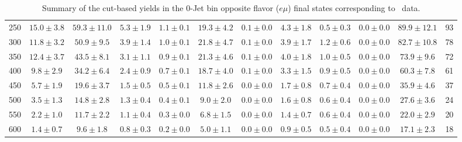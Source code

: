\begin{table}
{\begin{center}
\begin{tabular}{l c c c c c c c c c c c }
250 & $15.0\pm3.8$ & $59.3\pm11.0$ & $5.3\pm1.9$ & $1.1\pm0.1$ & $19.3\pm4.2$ & $0.1\pm0.0$ & $4.3\pm1.8$ & $0.5\pm0.3$ & $0.0\pm0.0$ & $89.9\pm12.1$ & 93 \\
300 & $11.8\pm3.2$ & $50.9\pm9.5$ & $3.9\pm1.4$ & $1.0\pm0.1$ & $21.8\pm4.7$ & $0.1\pm0.0$ & $3.9\pm1.7$ & $1.2\pm0.6$ & $0.0\pm0.0$ & $82.7\pm10.8$ & 78 \\
350 & $12.4\pm3.7$ & $43.5\pm8.1$ & $3.1\pm1.1$ & $0.9\pm0.1$ & $21.3\pm4.6$ & $0.1\pm0.0$ & $4.0\pm1.8$ & $1.0\pm0.5$ & $0.0\pm0.0$ & $73.9\pm9.6$ & 72 \\
400 & $9.8\pm2.9$ & $34.2\pm6.4$ & $2.4\pm0.9$ & $0.7\pm0.1$ & $18.7\pm4.0$ & $0.1\pm0.0$ & $3.3\pm1.5$ & $0.9\pm0.5$ & $0.0\pm0.0$ & $60.3\pm7.8$ & 61 \\
450 & $5.7\pm1.9$ & $19.6\pm3.7$ & $1.5\pm0.5$ & $0.5\pm0.1$ & $11.8\pm2.6$ & $0.0\pm0.0$ & $1.7\pm0.8$ & $0.7\pm0.4$ & $0.0\pm0.0$ & $35.9\pm4.6$ & 37 \\
500 & $3.5\pm1.3$ & $14.8\pm2.8$ & $1.3\pm0.4$ & $0.4\pm0.1$ & $9.0\pm2.0$ & $0.0\pm0.0$ & $1.6\pm0.8$ & $0.6\pm0.4$ & $0.0\pm0.0$ & $27.6\pm3.6$ & 24 \\
550 & $2.2\pm1.0$ & $11.7\pm2.2$ & $1.1\pm0.4$ & $0.3\pm0.0$ & $6.8\pm1.5$ & $0.0\pm0.0$ & $1.4\pm0.7$ & $0.6\pm0.4$ & $0.0\pm0.0$ & $22.0\pm2.9$ & 20 \\
600 & $1.4\pm0.7$ & $9.6\pm1.8$ & $0.8\pm0.3$ & $0.2\pm0.0$ & $5.0\pm1.1$ & $0.0\pm0.0$ & $0.9\pm0.5$ & $0.5\pm0.4$ & $0.0\pm0.0$ & $17.1\pm2.3$ & 18 \\
\hline
\end{tabular}
\end{center}
}
\caption{Summary of the cut-based yields in the 0-Jet bin opposite flavor ($e\mu$) final states corresponding to \intlumi\ data.}
\end{table}
